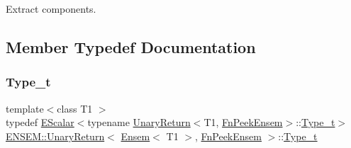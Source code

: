 Extract components. 

\subsection{Member Typedef Documentation}
\mbox{\label{structENSEM_1_1UnaryReturn_3_01Ensem_3_01T1_01_4_00_01FnPeekEnsem_01_4_a3bb59903a0e3c8d5e4b6ce0ac99c5454}} 
\subsubsection{\texorpdfstring{Type\_t}{Type\_t}\hspace{0.1cm}{\footnotesize\ttfamily [1/2]}}
{\footnotesize\ttfamily template$<$class T1 $>$ \\
typedef \mbox{\hyperlink{classENSEM_1_1EScalar}{E\+Scalar}}$<$typename \mbox{\hyperlink{structENSEM_1_1UnaryReturn}{Unary\+Return}}$<$T1, \mbox{\hyperlink{structENSEM_1_1FnPeekEnsem}{Fn\+Peek\+Ensem}}$>$\+::\mbox{\hyperlink{structENSEM_1_1UnaryReturn_3_01Ensem_3_01T1_01_4_00_01FnPeekEnsem_01_4_a3bb59903a0e3c8d5e4b6ce0ac99c5454}{Type\+\_\+t}}$>$ \mbox{\hyperlink{structENSEM_1_1UnaryReturn}{E\+N\+S\+E\+M\+::\+Unary\+Return}}$<$ \mbox{\hyperlink{classENSEM_1_1Ensem}{Ensem}}$<$ T1 $>$, \mbox{\hyperlink{structENSEM_1_1FnPeekEnsem}{Fn\+Peek\+Ensem}} $>$\+::\mbox{\hyperlink{structENSEM_1_1UnaryReturn_3_01Ensem_3_01T1_01_4_00_01FnPeekEnsem_01_4_a3bb59903a0e3c8d5e4b6ce0ac99c5454}{Type\+\_\+t}}}

\mbox{\label{structENSEM_1_1UnaryReturn_3_01Ensem_3_01T1_01_4_00_01FnPeekEnsem_01_4_a3bb59903a0e3c8d5e4b6ce0ac99c5454}} 
